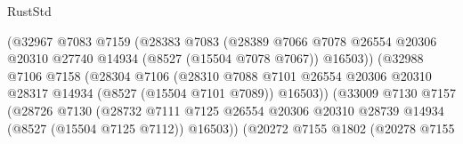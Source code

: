 \begin{lexlean}{RustStd}
\begin{coremodule}
                                      (@32967
                                        @7083
                                        @7159
                                        (@28383
                                          @7083
                                          (@28389
                                            @7066
                                            @7078
                                            @26554
                                            @20306
                                            @20310
                                            @27740
                                            @14934
                                            (@8527 (@15504 @7078 @7067))
                                            @16503))
                                        (@32988
                                          @7106
                                          @7158
                                          (@28304
                                            @7106
                                            (@28310
                                              @7088
                                              @7101
                                              @26554
                                              @20306
                                              @20310
                                              @28317
                                              @14934
                                              (@8527 (@15504 @7101 @7089))
                                              @16503))
                                          (@33009
                                            @7130
                                            @7157
                                            (@28726
                                              @7130
                                              (@28732
                                                @7111
                                                @7125
                                                @26554
                                                @20306
                                                @20310
                                                @28739
                                                @14934
                                                (@8527 (@15504 @7125 @7112))
                                                @16503))
                                            (@20272
                                              @7155
                                              @1802
                                              (@20278
                                                @7155

\end{coremodule}
\end{lexlean}
